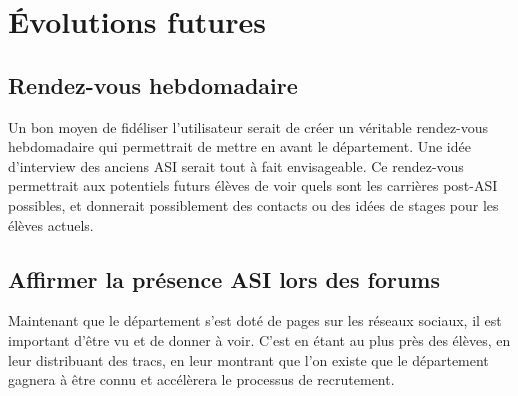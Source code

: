 \section{Évolutions futures}
\subsection{Rendez-vous hebdomadaire}
	Un bon moyen de fidéliser l'utilisateur serait de créer un véritable rendez-vous hebdomadaire qui permettrait de mettre en avant le département. 
	Une idée d'interview des anciens ASI serait tout à fait envisageable. Ce rendez-vous permettrait aux potentiels futurs élèves de voir quels sont les carrières post-ASI possibles, et donnerait possiblement des contacts ou des idées de stages pour les élèves actuels.
	
\subsection{Affirmer la présence ASI lors des forums}
	Maintenant que le département s'est doté de pages sur les réseaux sociaux, il est important d'être vu et de donner à voir. C'est en étant au plus près des élèves, en leur distribuant des tracs, en leur montrant que l'on existe que le département gagnera à être connu et accélèrera le processus de recrutement.